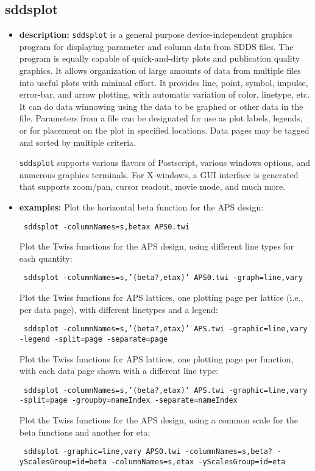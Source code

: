 %
\newpage

\subsection{sddsplot}
\label{sddsplot}

\begin{itemize}
\item {\bf description:}
{\tt sddsplot} is a general purpose device-independent graphics program for displaying parameter and column data
from SDDS files.  The program is equally capable of quick-and-dirty plots and publication quality graphics.  It
allows organization of large amounts of data from multiple files into useful plots with minimal effort.  It
provides line, point, symbol, impulse, error-bar, and arrow plotting, with automatic variation of color, linetype,
etc.  It can do data winnowing using the data to be graphed or other data in the file.  Parameters from a file can
be designated for use as plot labels, legends, or for placement on the plot in specified locations.  Data pages may
be tagged and sorted by multiple criteria.

{\tt sddsplot} supports various flavors of Postscript, various windows options, and numerous graphics terminals.  For
X-windows, a GUI interface is generated that supports zoom/pan, cursor readout, movie mode, and much more.

\item {\bf examples:} 
Plot the horizontal beta function for the APS design:
\begin{flushleft}{\tt 
sddsplot -columnNames=s,betax APS0.twi
}
\end{flushleft}
Plot the Twiss functions for the APS design, using different line types for
each quantity:
\begin{flushleft}{\tt 
sddsplot -columnNames=s,'(beta?,etax)' APS0.twi -graph=line,vary 
}
\end{flushleft}
Plot the Twiss functions for APS lattices, one plotting page per lattice (i.e., per
data page), with different linetypes and a legend:
\begin{flushleft}{\tt 
sddsplot -columnNames=s,'(beta?,etax)' APS.twi -graphic=line,vary -legend
        -split=page -separate=page
}\end{flushleft}
Plot the Twiss functions for APS lattices, one plotting page per function, with each 
data page shown with a different line type:
\begin{flushleft}{\tt 
sddsplot -columnNames=s,'(beta?,etax)' APS.twi -graphic=line,vary
        -split=page -groupby=nameIndex -separate=nameIndex
}
\end{flushleft}
Plot the Twiss functions for the APS design, using a common scale for the beta functions
and another for eta:
\begin{flushleft}{\tt
sddsplot -graphic=line,vary APS0.twi -columnNames=s,beta? -yScalesGroup=id=beta 
-columnNames=s,etax -yScalesGroup=id=eta
}


\end{flushleft}
\end{itemize}
